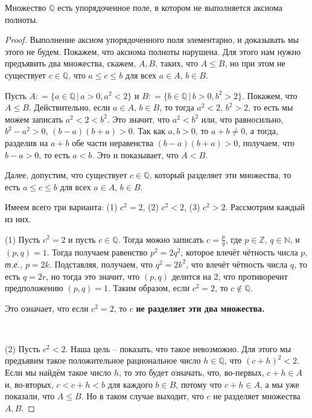 \begin{proposition}
    Множество $\mathbb{Q}$ есть упорядоченное поле, в котором не выполняется аксиома полноты.
\end{proposition}
\begin{proof}
    Выполнение аксиом упорядоченного поля элементарно, и доказывать мы этого не будем. Покажем, что аксиома полноты нарушена. Для этого нам нужно предъявить два множества, скажем, $A,B$, таких, что $A \le B$, но при этом не существует $c\in \mathbb{Q}$, что $a\le c \le b$ для всех $a\in A$, $b\in B.$

    Пусть $A: = \{a \in \mathbb{Q}\, | \, a >0, a^2 <2\}$ и $B: = \{b \in \mathbb{Q}\, |\, b>0, b^2 >2\}$. Покажем, что $A\le B$. Действительно, если $a\in A$, $b \in B$, то тогда $a^2 <2$, $b^2 >2$, то есть мы можем записать $a^2<2<b^2$. Это значит, что $a^2<b^2$ или, что равносильно, $b^2-a^2>0$, $(b-a)(b+a)>0$. Так как $a,b >0$, то $a+b \ne 0$, а тогда, разделив на $a+b$ обе части неравенства $(b-a)(b+a)>0$, получаем, что $b-a >0$, то есть $a<b$. Это и показывает, что $A<B$.

    Далее, допустим, что существует $c \in \mathbb{Q}$, который разделяет эти множества, то есть $a\le c \le b$ для всех $a\in A$, $b\in B.$

    Имеем всего три варианта: (1) $c^2 = 2$, (2) $c^2 <2$, (3) $c^2 >2$. Рассмотрим каждый из них.

(1) Пусть $c^2 =2$ и пусть $c\in \mathbb{Q}$. Тогда можно записать $c = \frac{p}{q}$, где $p \in \mathbb{Z}$, $q \in \mathbb{N}$, и $(p,q) = 1$. Тогда получаем равенство $p^2 = 2q^2$, которое влечёт чётность числа $p$, \textit{т.е.,} $p = 2k$. Подставляя, получаем, что $q^2 = 2k^2$, что влечёт чётность числа $q$, то есть $q = 2r$, но тогда это значит, что $(p,q)$ делится на $2$, что противоречит предположению $(p,q) =1$. Таким образом, если $c^2 = 2$, то $c\notin \mathbb{Q}$.\\

\centerline{
{\color{red}Это означает, что если $c^2=2$, то $c$ \textbf{не разделяет эти два множества.}}}~

(2) Пусть $c^2 <2$. Наша цель -- показать, что такое невозможно. Для этого мы предъявим такое положительное рациональное число $h\in \mathbb{Q}$, что $(c+h)^2 <2$. Если мы найдём такое число $h$, то это будет означать, что, во-первых, $c+h \in A$ и, во-вторых, $c < c+h <b$ для каждого $b \in B$, потому что $c+h \in A$, а мы уже показали, что $A \le B$. Но в таком случае выходит, что $c$ не разделяет множества $A,B$.


\end{proof}
